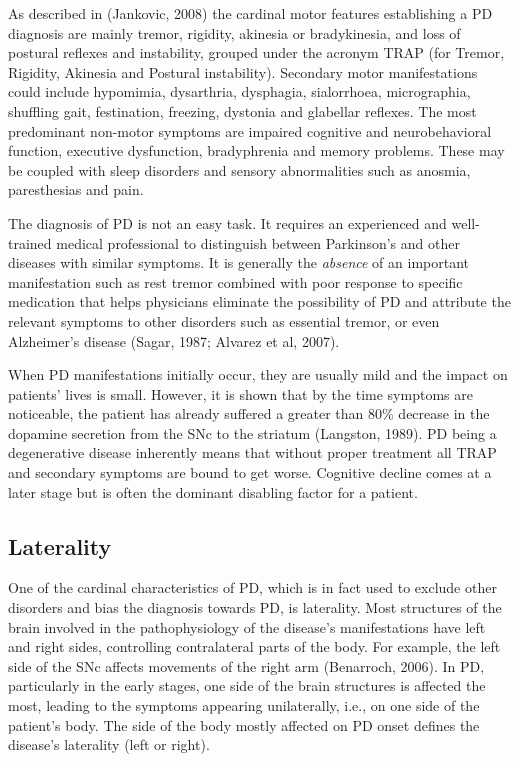 As described in (Jankovic, 2008) the cardinal motor features establishing a \gls{PD} diagnosis are mainly tremor, rigidity, akinesia or bradykinesia, and loss of postural reflexes and instability, grouped under the acronym \gls{TRAP} (for Tremor, Rigidity, Akinesia and Postural instability). Secondary motor manifestations could include hypomimia, dysarthria, dysphagia, sialorrhoea, micrographia, shuffling gait, festination, freezing, dystonia and glabellar reflexes. The most predominant non-motor symptoms are impaired cognitive and neurobehavioral function, executive dysfunction, bradyphrenia and memory problems. These may be coupled with sleep disorders and sensory abnormalities such as anosmia, paresthesias and pain.

The diagnosis of \gls{PD} is not an easy task. It requires an experienced and well-trained medical professional to distinguish between Parkinson's and other diseases with similar symptoms. It is generally the \textit{absence} of an important manifestation such as rest tremor combined with poor response to specific medication that helps physicians eliminate the possibility of \gls{PD} and attribute the relevant symptoms to other disorders such as essential tremor, or even Alzheimer's disease (Sagar, 1987; Alvarez et al, 2007).

When \gls{PD} manifestations initially occur, they are usually mild and the impact on patients' lives is small. However, it is shown that by the time symptoms are noticeable, the patient has already suffered a greater than 80\% decrease in the dopamine secretion from the \gls{SNc} to the striatum (Langston, 1989). \gls{PD} being a degenerative disease inherently means that without proper treatment all \gls{TRAP} and secondary symptoms are bound to get worse. Cognitive decline comes at a later stage but is often the dominant disabling factor for a patient. 


\subsection{Laterality}
\label{subsec:laterality}
One of the cardinal characteristics of \gls{PD}, which is in fact used to exclude other disorders and bias the diagnosis towards \gls{PD}, is laterality. Most structures of the brain involved in the pathophysiology of the disease's manifestations have left and right sides, controlling contralateral parts of the body. For example, the left side of the SNc affects movements of the right arm (Benarroch, 2006). In \gls{PD}, particularly in the early stages, one side of the brain structures is affected the most, leading to the symptoms appearing unilaterally, i.e., on one side of the patient's body. The side of the body mostly affected on \gls{PD} onset defines the disease's laterality (left or right). 

